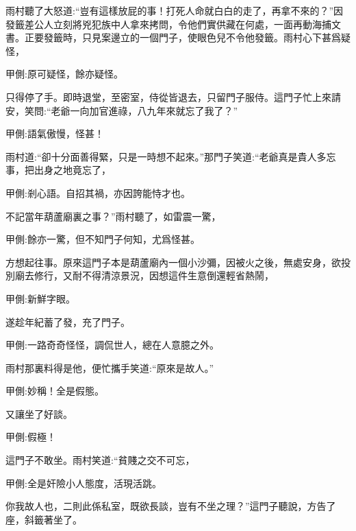 \begin{parag}
    雨村聽了大怒道:“豈有這樣放屁的事！打死人命就白白的走了，再拿不來的？”因發籤差公人立刻將兇犯族中人拿來拷問，令他們實供藏在何處，一面再動海捕文書。正要發籤時，只見案邊立的一個門子，使眼色兒不令他發籤。雨村心下甚爲疑怪，\begin{note}甲側:原可疑怪，餘亦疑怪。\end{note}只得停了手。即時退堂，至密室，侍從皆退去，只留門子服侍。這門子忙上來請安，笑問:“老爺一向加官進祿，八九年來就忘了我了？”\begin{note}甲側:語氣傲慢，怪甚！\end{note}雨村道:“卻十分面善得緊，只是一時想不起來。”那門子笑道:“老爺真是貴人多忘事，把出身之地竟忘了，\begin{note}甲側:剎心語。自招其禍，亦因誇能恃才也。\end{note}不記當年葫蘆廟裏之事？”雨村聽了，如雷震一驚，\begin{note}甲側:餘亦一驚，但不知門子何知，尤爲怪甚。\end{note}方想起往事。原來這門子本是葫蘆廟內一個小沙彌，因被火之後，無處安身，欲投別廟去修行，又耐不得清涼景況，因想這件生意倒還輕省熱鬧，\begin{note}甲側:新鮮字眼。\end{note}遂趁年紀蓄了發，充了門子。\begin{note}甲側:一路奇奇怪怪，調侃世人，總在人意臆之外。\end{note}雨村那裏料得是他，便忙攜手笑道:“原來是故人。”\begin{note}甲側:妙稱！全是假態。\end{note}又讓坐了好談。\begin{note}甲側:假極！\end{note}這門子不敢坐。雨村笑道:“貧賤之交不可忘，\begin{note}甲側:全是奸險小人態度，活現活跳。\end{note}你我故人也，二則此係私室，既欲長談，豈有不坐之理？”這門子聽說，方告了座，斜籤著坐了。
\end{parag}


